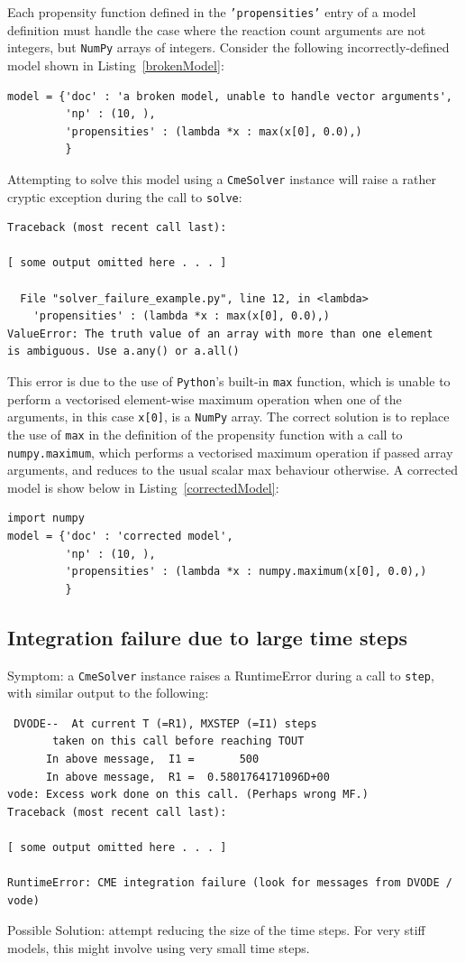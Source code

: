 \documentclass{article}
\newcommand{\mono}[1]{\texttt{#1}}
\newcommand{\python}{\mono{Python}}
\newcommand{\numpy}{\mono{NumPy}}
\newcommand{\lstref}[1]{Listing~\ref{#1}}
\begin{document}
Each propensity function defined in the \mono{'propensities'} entry
of a model definition must handle the case where the reaction count
arguments are not integers, but \numpy{} arrays of integers.
Consider the following incorrectly-defined model shown in
\lstref{brokenModel}:
\begin{lstlisting}[frame=tb,
caption={A broken model},
label=brokenModel]
model = {'doc' : 'a broken model, unable to handle vector arguments',
         'np' : (10, ),
         'propensities' : (lambda *x : max(x[0], 0.0),)
         }
\end{lstlisting}
Attempting to solve this model using a \mono{CmeSolver} instance will raise a
rather cryptic exception during the call to \mono{solve}:
\begin{verbatim}
Traceback (most recent call last):

[ some output omitted here . . . ]

  File "solver_failure_example.py", line 12, in <lambda>
    'propensities' : (lambda *x : max(x[0], 0.0),)
ValueError: The truth value of an array with more than one element
is ambiguous. Use a.any() or a.all()
\end{verbatim}
This error is due to the use of \python{}'s built-in \mono{max} function,
which is unable to perform a vectorised element-wise maximum operation when one
of the arguments, in this case \mono{x[0]}, is a \numpy{} array. The
correct solution is to replace the use of \mono{max} in the definition of the
propensity function with a call to \mono{numpy.maximum}, which performs a
vectorised maximum operation if passed array arguments, and reduces to the
usual scalar max behaviour otherwise. A corrected model is show below in
\lstref{correctedModel}:
\begin{lstlisting}[frame=tb,
caption={A corrected model},
label=correctedModel]
import numpy
model = {'doc' : 'corrected model',
         'np' : (10, ),
         'propensities' : (lambda *x : numpy.maximum(x[0], 0.0),)
         }
\end{lstlisting}


\subsection{Integration failure due to large time steps}
Symptom: a \mono{CmeSolver} instance raises a RuntimeError during a call to
\mono{step}, with similar output to the following:
\begin{verbatim}
 DVODE--  At current T (=R1), MXSTEP (=I1) steps   
       taken on this call before reaching TOUT     
      In above message,  I1 =       500
      In above message,  R1 =  0.5801764171096D+00
vode: Excess work done on this call. (Perhaps wrong MF.)
Traceback (most recent call last):

[ some output omitted here . . . ]

RuntimeError: CME integration failure (look for messages from DVODE / vode)
\end{verbatim}
Possible Solution: attempt reducing the size of the time steps. For very stiff
models, this might involve using very small time steps.
\end{document}
